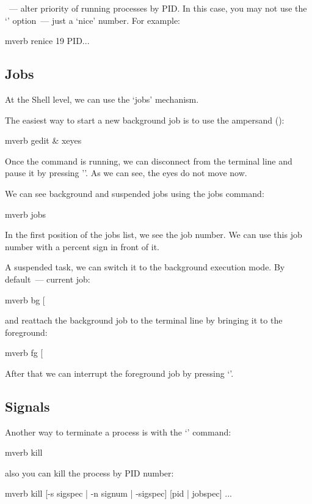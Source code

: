 {\bf{}}~--- alter priority of running processes by PID. In this
case, you may not use the `' option~--- just a `nice' number.
For example:
\begin{code}{mverb}
renice 19 PID...
\end{code}

\subsection*{Jobs}

At the Shell level, we can use the `jobs' mechanism.

The easiest way to start a new background job is to use the ampersand (\cmd{\&}):
\begin{code}{mverb}
gedit &
xeyes
\end{code}

Once the command is running, we can disconnect from the terminal line and
pause it by pressing ''. As we can see, the eyes do not move now.

We can see background and suspended jobs using the jobs command:
\begin{code}{mverb}
jobs
\end{code}

In the first position of the jobs list, we see the job number. We can use
this job number with a percent sign in front of it.

A suspended task, we can switch it to the background execution mode. By
default~--- current job:
\begin{code}{mverb}
bg [%
\end{code}
and reattach the background job to the terminal line by bringing it to
the foreground:
\begin{code}{mverb}
fg [%
\end{code}
After that we can interrupt the foreground job by pressing `'.

\subsection*{Signals}

Another way to terminate a process is with the `' command:
\begin{code}{mverb}
kill %
\end{code}
also you can kill the process by PID number:
\begin{code}{mverb}
kill [-s sigspec | -n signum | -sigspec] [pid | jobspec] ...
\end{code}

